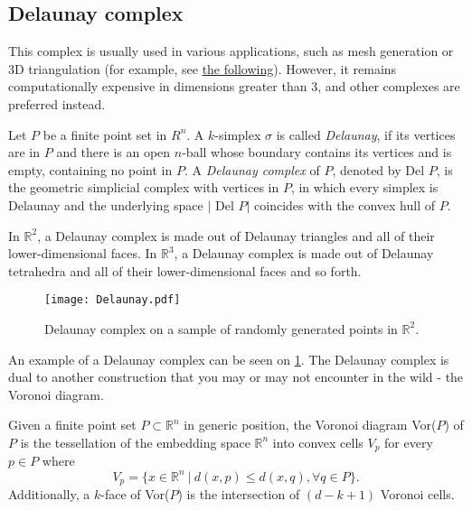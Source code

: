 \subsection{Delaunay complex}

This complex is usually used in various applications, such as mesh generation or 3D triangulation (for example, see \href{https://doc.cgal.org/latest/Manual/packages.html#PartTriangulationsAndDelaunayTriangulations}{the following}). However, it remains computationally expensive in dimensions greater than 3, and other complexes are preferred instead.

\begin{definition}
  Let $P$ be a finite point set in $R^{n}$. A $k$-simplex $\sigma$ is called \textit{Delaunay}, if its vertices are in $P$ and there is an open $n$-ball whose boundary contains its vertices and is empty, containing no point in $P$. A \textit{Delaunay complex} of $P$, denoted by Del $P$, is the geometric simplicial complex with vertices in $P$, in which every simplex is Delaunay and the underlying space $\vert$ Del $P \vert$ coincides with the convex hull of $P$.
\end{definition}

In $\mathbb{R}^{2}$, a Delaunay complex is made out of Delaunay triangles and all of their lower-dimensional faces. In $\mathbb{R}^{3}$, a Delaunay complex is made out of Delaunay tetrahedra and all of their lower-dimensional faces and so forth.

\begin{figure}[h!]
  \centering
  \texttt{[image: Delaunay.pdf]}
  \caption{Delaunay complex on a sample of randomly generated points in $\mathbb{R}^2$.}
  \label{fig:Delaunay}
\end{figure}

\noindent
An example of a Delaunay complex can be seen on \ref{fig:Delaunay}. The Delaunay complex is dual to another construction that you may or may not encounter in the wild - the Voronoi diagram.

\begin{definition}
  Given a finite point set $P \subset \mathbb{R}^{n}$ in generic position, the Voronoi diagram Vor($P$) of $P$ is the tessellation of the embedding space $\mathbb{R}^{n}$ into convex cells $V_{p}$ for every $p \in P$ where
  \begin{equation*}
    V_{p} = \{x \in \mathbb{R}^{n} \: \vert \: d(x,p) \leq d(x,q), \forall q \in P\}.
  \end{equation*}
  Additionally, a $k$-face of Vor($P$) is the intersection of $(d-k+1)$ Voronoi cells.
\end{definition}

